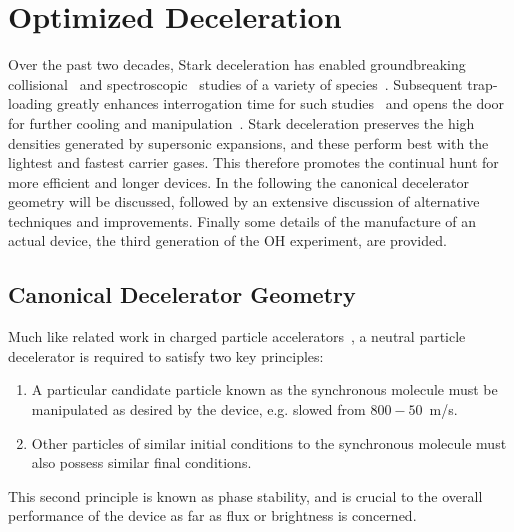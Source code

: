 %
%
%


\chapter{Optimized Deceleration}
\label{chapter:slowing}

Over the past two decades, Stark deceleration has enabled groundbreaking collisional~\cite{Sawyer2011,Kirste2012,Gao2018} and spectroscopic~\cite{Veldhoven2004,Hudson2006,Lev2006,Fast2018} studies of a variety of species~\cite{VanDeMeerakker2012}. 
Subsequent trap-loading greatly enhances interrogation time for such studies~\cite{Sawyer2008} and opens the door for further cooling and manipulation~\cite{Stuhl2012evap, Reens2017}. 
Stark deceleration preserves the high densities generated by supersonic expansions, and these perform best with the lightest and fastest carrier gases.
This therefore promotes the continual hunt for more efficient and longer devices.
In the following the canonical decelerator geometry will be discussed, followed by an extensive discussion of alternative techniques and improvements.
Finally some details of the manufacture of an actual device, the third generation of the OH experiment, are provided.


\section{Canonical Decelerator Geometry}

Much like related work in charged particle accelerators~\cite{McMillan1945}, a neutral particle decelerator is required to satisfy two key principles:
\begin{enumerate}
\item A particular candidate particle known as the synchronous molecule must be manipulated as desired by the device, e.g. slowed from $800-50$~m/s.
\item Other particles of similar initial conditions to the synchronous molecule must also possess similar final conditions.
\end{enumerate}
This second principle is known as phase stability, and is crucial to the overall performance of the device as far as flux or brightness is concerned.

